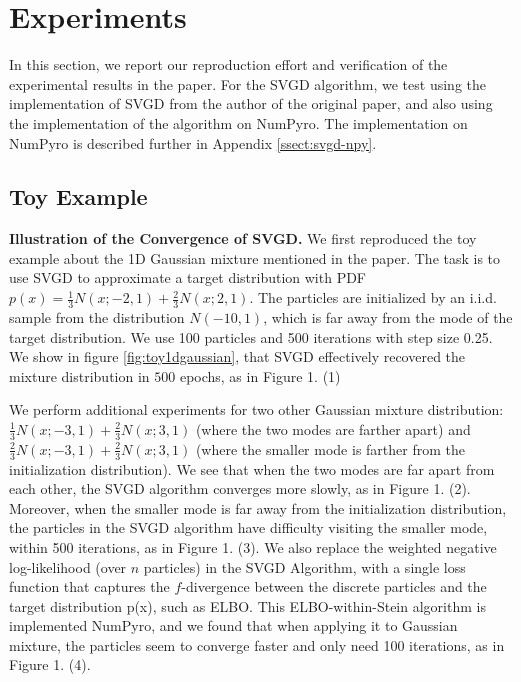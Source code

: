 \section{Experiments}
In this section, we report our reproduction effort and verification of the experimental results in the paper. For the SVGD algorithm, we test using the implementation of SVGD from the author of the original paper, and also using the implementation of the algorithm on NumPyro. The implementation on NumPyro is described further in Appendix \ref{ssect:svgd-npy}.

\subsection{Toy Example}


\noindent\textbf{Illustration of the Convergence of SVGD.} We first reproduced the toy example about the 1D Gaussian mixture mentioned in the paper. The task is to use SVGD to approximate a target distribution with PDF $p(x) = \frac{1}{3} N(x; -2, 1) + \frac{2}{3} N(x; 2, 1)$. The particles are initialized by an i.i.d. sample from the distribution $N(-10, 1)$, which is far away from the mode of the target distribution. We use 100 particles and 500 iterations with step size 0.25. We show in figure \ref{fig:toy1dgaussian}, that SVGD effectively recovered the mixture distribution in $500$ epochs, as in Figure 1. (1)

We perform additional experiments for two other Gaussian mixture distribution: $\frac{1}{3} N(x; -3, 1) + \frac{2}{3} N(x; 3, 1)$ (where the two modes are farther apart) and $\frac{2}{3} N(x; -3, 1) + \frac{2}{3} N(x; 3, 1)$ (where the smaller mode is farther from the initialization distribution). We see that when the two modes are far apart from each other, the SVGD algorithm converges more slowly, as in Figure 1. (2). Moreover, when the smaller mode is far away from the initialization distribution, the particles in the SVGD algorithm have difficulty visiting the smaller mode, within 500 iterations, as in Figure 1. (3). We also replace the weighted negative log-likelihood (over $n$ particles) in the SVGD Algorithm, with a single loss function that captures the $f$-divergence between the discrete particles and the target distribution p(x), such as ELBO. This ELBO-within-Stein algorithm is implemented NumPyro, and we found that when applying it to Gaussian mixture, the particles seem to converge faster and only need 100 iterations, as in Figure 1. (4).

